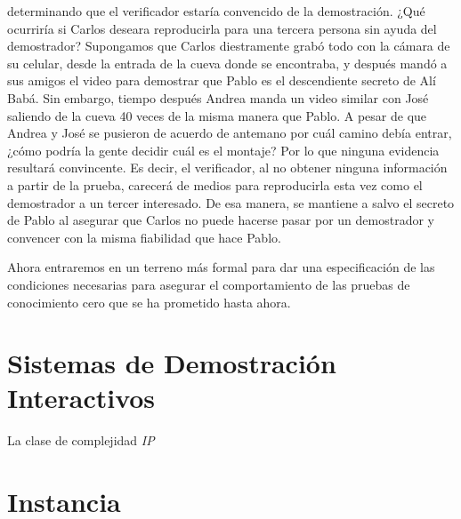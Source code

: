 \documentclass[oneside,10pt]{article}
\begin{document}
\begin{itemize}
  determinando que el verificador estaría convencido de la demostración. ¿Qué ocurriría si Carlos
  deseara reproducirla para una tercera persona sin ayuda del demostrador? Supongamos que Carlos
  diestramente
  grabó todo con la cámara de su celular, desde la entrada de la cueva donde se encontraba, y después
  mandó a sus amigos el video para demostrar que Pablo es el descendiente secreto de Alí Babá. Sin
  embargo, tiempo después Andrea manda un video similar con José saliendo de la cueva 40 veces de la
  misma manera que Pablo. A pesar de que Andrea y José se pusieron de acuerdo de antemano por cuál
  camino debía entrar, ¿cómo podría la gente decidir cuál es el montaje? Por lo que ninguna evidencia resultará convincente. Es decir, el verificador,
  al no obtener ninguna información a partir de la prueba, carecerá de medios para reproducirla esta vez
  como el demostrador a un tercer interesado. De esa manera, se mantiene a salvo el secreto de Pablo al asegurar que Carlos
  no puede hacerse pasar por un demostrador y convencer con la misma fiabilidad que hace Pablo.
\end{itemize}

Ahora entraremos en un terreno más formal para dar una especificación de las condiciones necesarias
para asegurar el comportamiento de las pruebas de conocimiento cero que se ha prometido hasta ahora.

\section{Sistemas de Demostración Interactivos}
La clase de complejidad \emph{IP} \cite{arora}


\section{Instancia}
\end{document}
